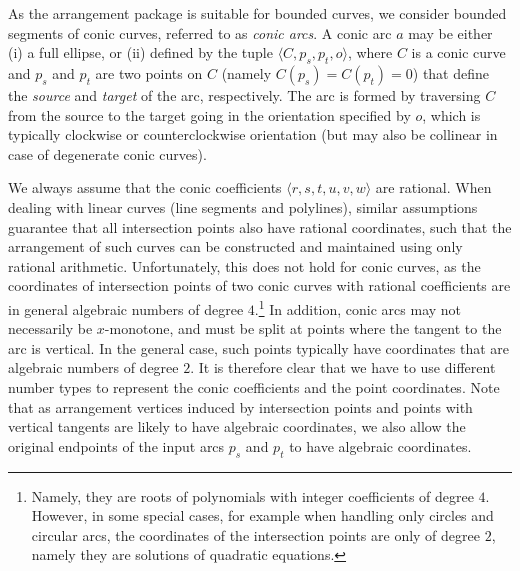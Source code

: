As the arrangement package is suitable for bounded curves, we
consider bounded segments of conic curves, referred to as {\em
conic arcs}. A conic arc $a$ may be either (i) a full ellipse, or
(ii) defined by the tuple $\langle C, p_s, p_t, o \rangle$, where
$C$ is a conic curve and $p_s$ and $p_t$ are two points on $C$
(namely $C(p_s) = C(p_t) = 0$) that define the {\em source} and
{\em target} of the arc, respectively. The arc is formed by
traversing $C$ from the source to the target going in the
orientation specified by $o$, which is typically clockwise or
counterclockwise orientation (but may also be collinear in case of
degenerate conic curves).

We always assume that the conic coefficients $\langle r, s,
t, u, v, w \rangle$ are rational. When dealing with linear curves
(line segments and polylines), similar assumptions guarantee that
all intersection points also have rational coordinates, such that
the arrangement of such curves can be constructed and maintained
using only rational arithmetic. Unfortunately, this does not hold
for conic curves, as the coordinates of intersection points of two
conic curves with rational coefficients are in general algebraic
numbers of degree $4$.\footnote{Namely, they are roots of
polynomials with integer coefficients of degree $4$. However, in
some special cases, for example when handling only circles and
circular arcs, the coordinates of the intersection points are only
of degree $2$, namely they are solutions of quadratic equations.}
In addition, conic arcs may not necessarily be $x$-monotone, and
must be split at points where the tangent to the arc is vertical.
In the general case, such points typically have coordinates that
are algebraic numbers of degree $2$.
It is therefore clear that we have to use different number types
to represent the conic coefficients and the point coordinates.
Note that as arrangement vertices induced by intersection points
and points with vertical tangents are likely to have algebraic
coordinates, we also allow the original endpoints of the input arcs
$p_s$ and $p_t$ to have algebraic coordinates.

